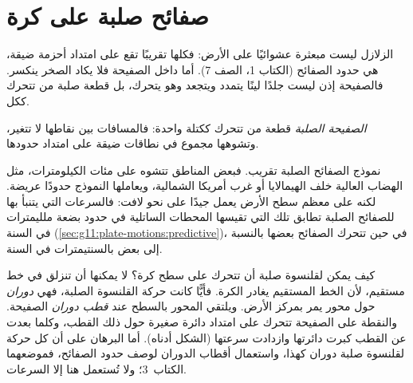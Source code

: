 \section{صفائح صلبة على كرة}

الزلازل ليست مبعثرة عشوائيًا على الأرض: فكلها تقريبًا
تقع على امتداد أحزمة ضيقة، هي حدود الصفائح (الكتاب 1، الصف 7). أما داخل
الصفيحة فلا يكاد الصخر ينكسر. فالصفيحة إذن ليست جلدًا لينًا
يتمدد ويتجعد وهو يتحرك، بل قطعة صلبة من 
تتحرك ككل.

\begin{definition}\label{def:g11:plate-motions:rigid-plate}
\emph{الصفيحة الصلبة} قطعة من  تتحرك
ككتلة واحدة: فالمسافات بين نقاطها لا تتغير، وتشوهها
مجموع في نطاقات ضيقة على امتداد حدودها.
\end{definition}

نموذج الصفائح الصلبة تقريب. فبعض المناطق تتشوه على مئات
الكيلومترات، مثل الهضاب العالية خلف الهيمالايا أو غرب
أمريكا الشمالية، ويعاملها النموذج حدودًا عريضة. لكنه على معظم
سطح الأرض يعمل جيدًا على نحو لافت: فالسرعات التي يتنبأ بها
للصفائح الصلبة تطابق تلك التي تقيسها المحطات الساتلية في حدود بضعة
ملليمترات في السنة (\cref{sec:g11:plate-motions:predictive})، في حين تتحرك الصفائح
بعضها بالنسبة إلى بعض بالسنتيمترات في السنة.

كيف يمكن لقلنسوة صلبة أن تتحرك على سطح كرة؟ لا يمكنها أن تنزلق في
خط مستقيم، لأن الخط المستقيم يغادر الكرة. فأيًّا كانت حركة
القلنسوة الصلبة، فهي \emph{دوران} حول محور يمر بمركز
الأرض. ويلتقي المحور بالسطح عند \emph{قطب دوران} الصفيحة. والنقطة
على الصفيحة تتحرك على امتداد دائرة صغيرة حول ذلك القطب، وكلما
بعدت عن القطب كبرت دائرتها وازدادت سرعتها
(الشكل أدناه). أما البرهان على أن كل حركة
لقلنسوة صلبة دوران كهذا، واستعمال أقطاب الدوران لوصف حدود
الصفائح، فموضعهما الكتاب~3؛ ولا تُستعمل هنا إلا السرعات.

